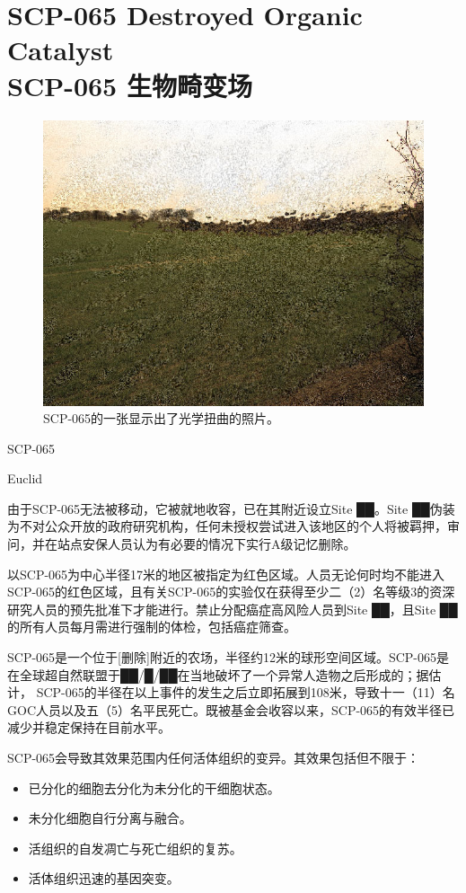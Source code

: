\chapter[SCP-065 生物畸变场]{
    SCP-065 Destroyed Organic Catalyst\\
    SCP-065 生物畸变场
}

\label{chap:SCP-065}

\begin{figure}[H]
    \centering
    \includegraphics[width=0.5\linewidth]{images/SCP-065.jpg}
    \caption*{SCP-065的一张显示出了光学扭曲的照片。}
\end{figure}

SCP-065

Euclid

由于SCP-065无法被移动，它被就地收容，已在其附近设立Site ██。Site ██伪装为不对公众开放的政府研究机构，任何未授权尝试进入该地区的个人将被羁押，审问，并在站点安保人员认为有必要的情况下实行A级记忆删除。

以SCP-065为中心半径17米的地区被指定为红色区域。人员无论何时均不能进入SCP-065的红色区域，且有关SCP-065的实验仅在获得至少二（2）名等级3的资深研究人员的预先批准下才能进行。禁止分配癌症高风险人员到Site ██，且Site ██的所有人员每月需进行强制的体检，包括癌症筛查。

SCP-065是一个位于{[}删除]附近的农场，半径约12米的球形空间区域。SCP-065是在全球超自然联盟于██\slash █\slash ██在当地破坏了一个异常人造物之后形成的；据估计， SCP-065的半径在以上事件的发生之后立即拓展到108米，导致十一（11）名GOC人员以及五（5）名平民死亡。既被基金会收容以来，SCP-065的有效半径已减少并稳定保持在目前水平。

SCP-065会导致其效果范围内任何活体组织的变异。其效果包括但不限于：

\begin{itemize}
\item 已分化的细胞去分化为未分化的干细胞状态。
\item 未分化细胞自行分离与融合。
\item 活组织的自发凋亡与死亡组织的复苏。
\item 活体组织迅速的基因突变。
\end{itemize}

